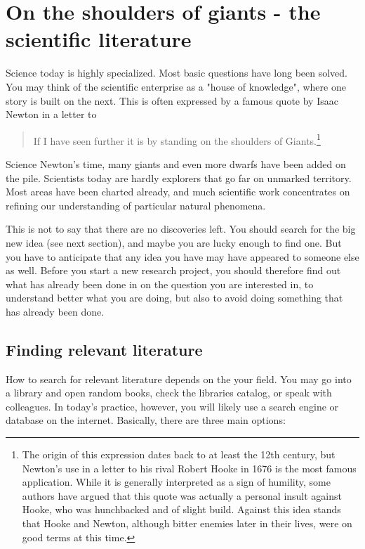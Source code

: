 \documentclass{tufte-book}
\begin{document}


\chapter{On the shoulders of giants - the scientific literature}

Science today is highly specialized. Most basic questions have long been solved. You may think of the scientific enterprise as a "house of knowledge", where one story is built on the next. This is often expressed by a famous quote by Isaac Newton in a letter to 

\begin{quote}
If I have seen further it is by standing on the shoulders of Giants.\footnote{The origin of this expression dates back to at least the 12th century, but Newton's use in a letter to his rival Robert Hooke in 1676 is the most famous application. While it is generally interpreted as a sign of humility, some authors have argued that this quote was actually a personal insult against Hooke, who was hunchbacked and of slight build. Against this idea stands that Hooke and Newton, although bitter enemies later in their lives, were on good terms at this time.}
\end{quote}

Science Newton's time, many giants and even more dwarfs have been added on the pile. Scientists today are hardly explorers that go far on unmarked territory. Most areas have been charted already, and much scientific work concentrates on refining our understanding of particular natural phenomena. 

This is not to say that there are no discoveries left. You should search for the big new idea (see next section), and maybe you are lucky enough to find one. But you have to anticipate that any idea you have may have appeared to someone else as well. Before you start a new research project, you should therefore find out what has already been done in on the question you are interested in, to understand better what you are doing, but also to avoid doing something that has already been done. 


\section{Finding relevant literature}

How to search for relevant literature depends on the your field. You may go into a library and open random books, check the libraries catalog, or speak with colleagues. In today's practice, however, you will likely use a search engine or database on the internet. Basically, there are three main options: 
\end{document}

